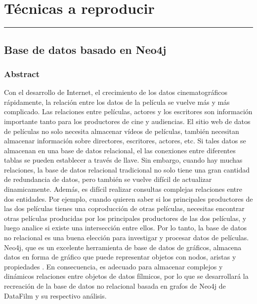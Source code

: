 \chapter{Técnicas a reproducir}
\hrule  \vspace*{0.5cm}
\section{Base de datos basado en Neo4j}
\subsection{Abstract}
Con el desarrollo de Internet, el crecimiento de los datos cinematográficos
rápidamente, la relación entre los datos de la película se vuelve más y
más complicado. Las relaciones entre películas, actores
y los escritores son información importante tanto para los productores de cine
y audiencias. El sitio web de datos de películas no solo necesita almacenar
vídeos de películas, también necesitan almacenar información sobre
directores, escritores, actores, etc.
Si tales datos se almacenan en una base de datos relacional, el
las conexiones entre diferentes tablas se pueden establecer a través de
llave. Sin embargo, cuando hay muchas relaciones, la base de datos relacional tradicional no solo tiene una gran cantidad de
redundancia de datos, pero también se vuelve difícil de actualizar
dinamicamente. Además, es difícil realizar consultas complejas
relaciones entre dos entidades. Por ejemplo, cuando
quieren saber si los principales productores de las dos películas
tienes una coproducción de otras películas, necesitas encontrar otras
películas producidas por los principales productores de las dos películas, y
luego analice si existe una intersección entre ellos.
Por lo tanto, la base de datos no relacional es una buena elección para
investigar y procesar datos de películas. Neo4j, que es un
excelente herramienta de base de datos de gráficos, almacena datos en forma de gráfico que puede representar objetos con nodos, aristas y propiedades \cite{lu2017analysis}.
En consecuencia, es adecuado para almacenar complejos y dinámicos
relaciones entre objetos de datos fílmicos, por lo que se desarrollará la recreación de la base de datos no relacional basada en grafos de Neo4j de DataFilm y su respectivo análisis.
